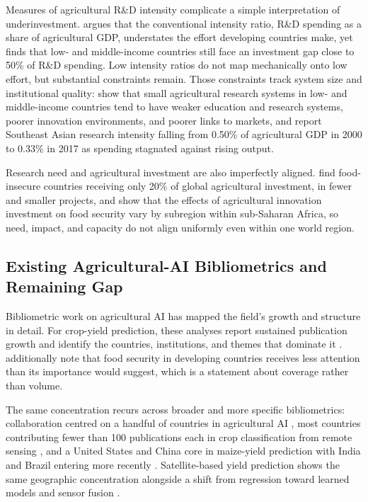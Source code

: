 \documentclass[ASNA,twocolumn]{USG}
\begin{document}
Measures of agricultural R\&D intensity complicate a simple interpretation of underinvestment.
\citet{NinPratt2021} argues that the conventional intensity ratio, R\&D spending as a
share of agricultural GDP, understates the effort developing countries make, yet finds that
low- and middle-income countries still face an investment gap close to 50\% of R\&D spending.
Low intensity ratios do not map mechanically onto low effort, but substantial constraints
remain. Those constraints track system size and institutional quality:
\citet{NinPratt2023} show that small agricultural research systems in low- and
middle-income countries tend to have weaker education and research systems, poorer innovation
environments, and poorer links to markets, and \citet{Stads2020} report Southeast Asian
research intensity falling from 0.50\% of agricultural GDP in 2000 to 0.33\% in 2017 as
spending stagnated against rising output.

Research need and agricultural investment are also imperfectly aligned. \citet{Zhao2023}
find food-insecure countries
receiving only 20\% of global agricultural investment, in fewer and smaller projects, and
\citet{Malec2024} show that the effects of agricultural innovation investment on food
security vary by subregion within sub-Saharan Africa, so need, impact, and capacity do not
align uniformly even within one world region.

\subsection{Existing Agricultural-AI Bibliometrics and Remaining Gap}

Bibliometric work on agricultural AI has mapped the field's growth and structure in detail.
For crop-yield prediction, these analyses report sustained publication growth and identify the
countries, institutions, and themes that dominate it
\cite{Lokeshwari2024,Momenpour2024}. \citet{Momenpour2024} additionally note that
food security in developing countries receives less attention than its importance would
suggest, which is a statement about coverage rather than volume.

The same concentration recurs across broader and more specific bibliometrics: collaboration
centred on a handful of countries in agricultural AI \cite{Bhagat2022,Zhang2021}, most
countries contributing fewer than 100 publications each in crop classification from remote
sensing \cite{SanchezChavez2026}, and a United States and China core in maize-yield
prediction with India and Brazil entering more recently \cite{Sakthivel2026}.
Satellite-based yield prediction shows the same geographic concentration alongside a shift
from regression toward learned models and sensor fusion \cite{Radocaj2026a}.
\end{document}
